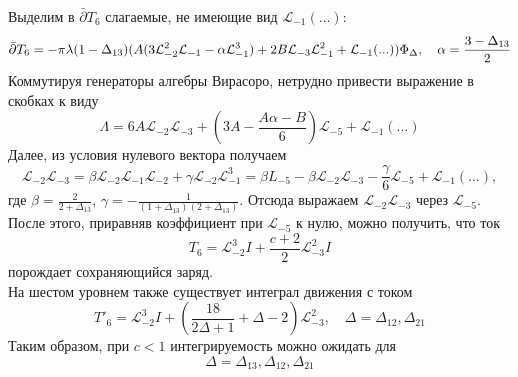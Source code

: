 \documentclass[12pt]{article}
\theoremstyle{definition}
\begin{document}
Выделим в $\bar{\partial}T_6$ слагаемые, не имеющие вид $\mathcal{L}_{-1}(...)$:
\begin{equation}
    \Bar{\partial}T_6=-\pi\lambda(1-\Delta_{13})(A(3\mathcal{L}_{-2}^2\mathcal{L}_{-1}-\alpha\mathcal{L}_{-1}^3)+2B\mathcal{L}_{-3}\mathcal{L}_{-1}^2+\mathcal{L}_{-1}(...))\Phi_\Delta,\quad\alpha=\frac{3-\Delta_{13}}{2}
\end{equation}
Коммутируя генераторы алгебры Вирасоро, нетрудно привести выражение в скобках к виду
\begin{equation}
    \Lambda=6A\mathcal{L}_{-2}\mathcal{L}_{-3}+\left(3A-\frac{A\alpha-B}{6}\right)\mathcal{L}_{-5}+\mathcal{L}_{-1}(...)
\end{equation}
Далее, из условия нулевого вектора получаем
\begin{equation}
    \mathcal{L}_{-2}\mathcal{L}_{-3}=\beta\mathcal{L}_{-2}\mathcal{L}_{-1}\mathcal{L}_{-2}+\gamma\mathcal{L}_{-2}\mathcal{L}_{-1}^3=\beta L_{-5}-\beta\mathcal{L}_{-2}\mathcal{L}_{-3}-\frac{\gamma}{6}\mathcal{L}_{-5}+\mathcal{L}_{-1}(...),
\end{equation}
где $\beta=\frac{2}{2+\Delta_{13}}$, $\gamma=-\frac{1}{(1+\Delta_{13})(2+\Delta_{13})}$. Отсюда выражаем $\mathcal{L}_{-2}\mathcal{L}_{-3}$ через $\mathcal{L}_{-5}$. После этого, приравняв коэффициент при $\mathcal{L}_{-5}$ к нулю, можно получить, что ток
\begin{equation}
    T_6=\mathcal{L}_{-2}^3I+\frac{c+2}{2}\mathcal{L}_{-3}^2I
\end{equation}
порождает сохраняющийся заряд.\\
На шестом уровнем также существует интеграл движения с током
\begin{equation}
    T'_6=\mathcal{L}_{-2}^3I+\left(\frac{18}{2\Delta+1}+\Delta-2\right)\mathcal{L}^2_{-3},\quad\Delta=\Delta_{12},\Delta_{21}
\end{equation}
Таким образом, при $c < 1$ интегрируемость можно ожидать для
\begin{equation}
    \Delta=\Delta_{13},\Delta_{12},\Delta_{21}
\end{equation}
\end{document}
